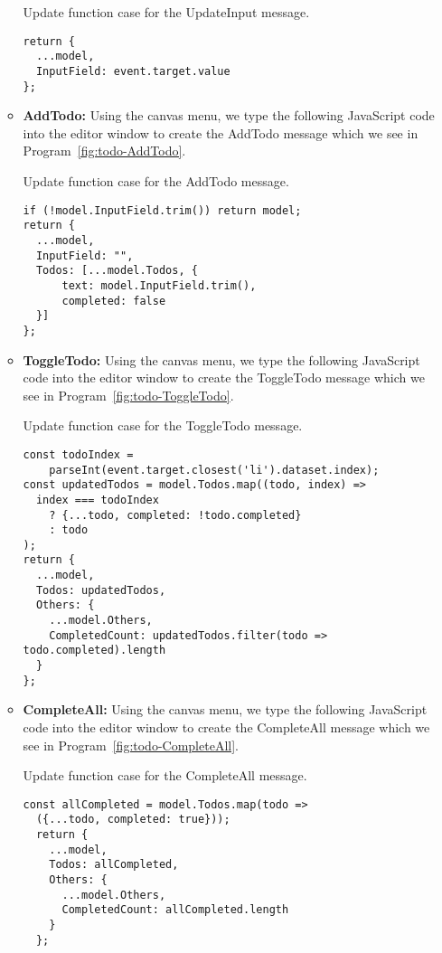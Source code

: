 \begin{enumerate}
\begin{itemize}
\begin{listing}[htbp]
\caption{Update function case for the UpdateInput message.}
\label{fig:todo-updateInput}
\begin{lstlisting}
return {
  ...model,
  InputField: event.target.value
};
            \end{lstlisting}
\end {listing}


\item \textbf{AddTodo:} Using the canvas menu, we type the following JavaScript code into the editor window to create the AddTodo message which we see in Program~\ref{fig:todo-AddTodo}.

\begin{listing}[htbp]
	\caption{Update function case for the AddTodo message.}
	\label{fig:todo-AddTodo}
	\begin{lstlisting}
if (!model.InputField.trim()) return model;
return {
  ...model,
  InputField: "",
  Todos: [...model.Todos, {
      text: model.InputField.trim(),
      completed: false
  }]
};
            \end{lstlisting}
\end{listing}

\item \textbf{ToggleTodo:} Using the canvas menu, we type the following JavaScript code into the editor window to create the ToggleTodo message which we see in Program~\ref{fig:todo-ToggleTodo}.
\begin{listing}[htbp]
	\caption{Update function case for the ToggleTodo message.}
	\label{fig:todo-ToggleTodo}
	\begin{lstlisting}
const todoIndex = 
    parseInt(event.target.closest('li').dataset.index);
const updatedTodos = model.Todos.map((todo, index) =>
  index === todoIndex
    ? {...todo, completed: !todo.completed}
    : todo
);
return {
  ...model,
  Todos: updatedTodos,
  Others: {
    ...model.Others,
    CompletedCount: updatedTodos.filter(todo => todo.completed).length
  }
};
            \end{lstlisting}
\end{listing}

\item \textbf{CompleteAll:} Using the canvas menu, we type the following JavaScript code into the editor window to create the CompleteAll message which we see in Program~\ref{fig:todo-CompleteAll}.


\begin{listing}[htbp]
	\caption{Update function case for the CompleteAll message.}
	\label{fig:todo-CompleteAll}
	\begin{lstlisting}
const allCompleted = model.Todos.map(todo => 
  ({...todo, completed: true}));
  return {
    ...model,
    Todos: allCompleted,
    Others: {
      ...model.Others,
      CompletedCount: allCompleted.length
    }
  };
  \end{lstlisting}
\end{listing}


\end{itemize}
\end{enumerate}
